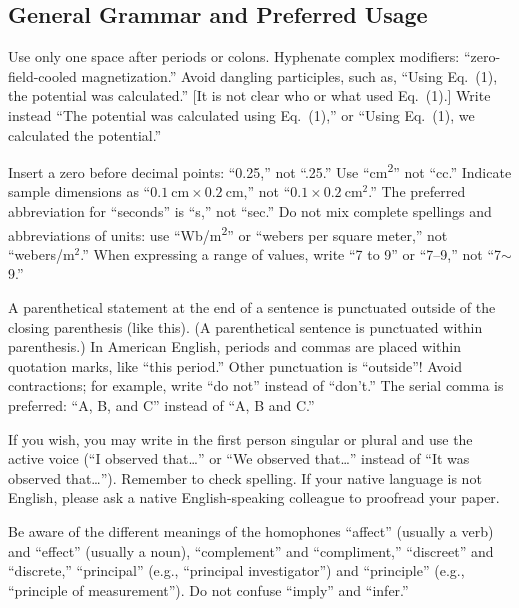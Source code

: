 \subsection{General Grammar and Preferred Usage}
Use only one space after periods or colons. Hyphenate complex modifiers: ``zero-field-cooled magnetization.'' Avoid dangling participles, such as, ``Using Eq.~(1), the potential was calculated.'' [It is not clear who or what used Eq.~(1).] Write instead ``The potential was calculated using Eq.~(1),'' or ``Using Eq.~(1), we calculated the potential.''

Insert a zero before decimal points: ``0.25,'' not ``.25.'' Use ``\si{\centi\meter\squared}'' not ``cc.'' Indicate sample dimensions as ``$\SI{0.1}{\centi\meter} \times \SI{0.2}{\centi\meter}$,'' not ``$0.1 \times \SI{0.2}{\centi\meter\squared}$.'' The preferred abbreviation for ``seconds'' is ``s,'' not ``sec.'' Do not mix complete spellings and abbreviations of units: use ``\si[per-mode=symbol]{\weber\per\meter\squared}'' or ``webers per square meter,'' not ``webers/m$^2$.'' When expressing a range of values, write ``7 to 9'' or ``7--9,'' not ``7$\sim$9.''

A parenthetical statement at the end of a sentence is punctuated outside of the closing parenthesis (like this). (A parenthetical sentence is punctuated within parenthesis.) In American English, periods and commas are placed within quotation marks, like ``this period.'' Other punctuation is ``outside''! Avoid contractions; for example, write ``do not'' instead of ``don’t.'' The serial comma is preferred: ``A, B, and C'' instead of ``A, B and C.''

If you wish, you may write in the first person singular or plural and use the active voice (``I observed that\ldots'' or ``We observed that\ldots'' instead of ``It was observed that\ldots''). Remember to check spelling. If your native language is not English, please ask a native English-speaking colleague to proofread your paper.

Be aware of the different meanings of the homophones ``affect'' (usually a verb) and ``effect'' (usually a noun), ``complement'' and ``compliment,'' ``discreet'' and ``discrete,'' ``principal'' (e.g., ``principal investigator'') and ``principle'' (e.g., ``principle of measurement''). Do not confuse ``imply'' and ``infer.''

